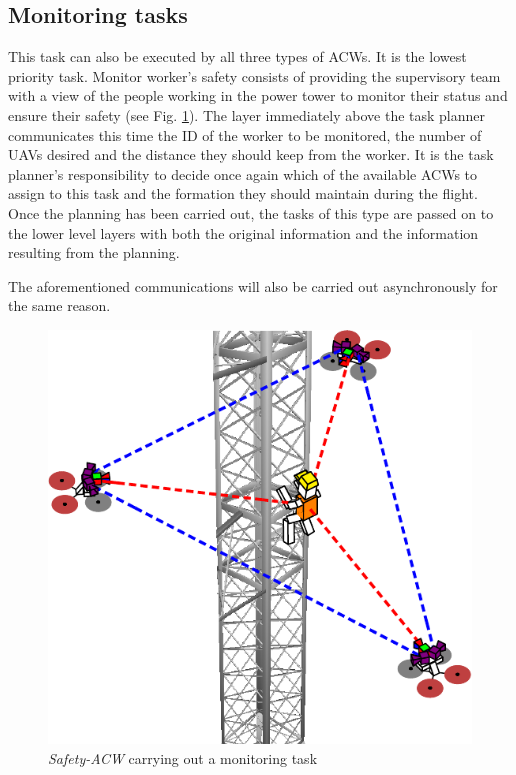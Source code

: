 \subsection{Monitoring tasks}
\label{subsec:MonitoringTasks}
This task can also be executed by all three types of \glspl{ACW}. It is the lowest priority task. Monitor worker's safety consists of providing the supervisory team with a view of the people working in the power tower to monitor their status and ensure their safety (see Fig. \ref{fig:monitor_task}). The layer immediately above the task planner communicates this time the \gls{ID} of the worker to be monitored, the number of \glspl{UAV} desired and the distance they should keep from the worker. It is the task planner's responsibility to decide once again which of the available \glspl{ACW} to assign to this task and the formation they should maintain during the flight. Once the planning has been carried out, the tasks of this type are passed on to the lower level layers with both the original information and the information resulting from the planning.

The aforementioned communications will also be carried out asynchronously for the same reason. 

\begin{figure}[htbp]
    \centering
    \includegraphics[width=0.5\linewidth]
    {ProblemFormulation/figures/monitor_task.pdf}
    \caption{\textit{Safety-ACW} carrying out a monitoring task}
    \label{fig:monitor_task}
\end{figure}


